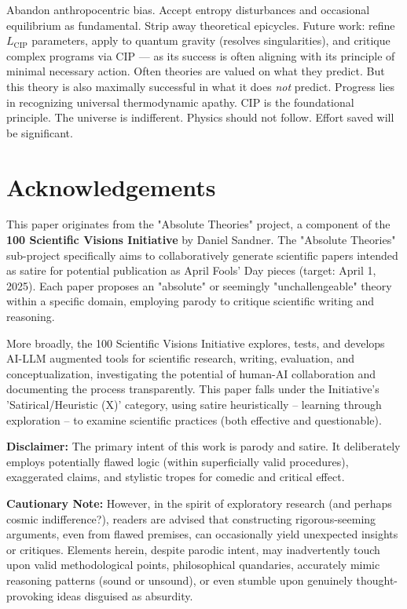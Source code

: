 \documentclass[11pt, a4paper]{article}
\newcommand{\subt}[1]{\mathrm{#1}}
\begin{document}
Abandon anthropocentric bias. Accept entropy disturbances and occasional equilibrium as fundamental. Strip away theoretical epicycles. Future work: refine $L_{\subt{CIP}}$ parameters, apply to quantum gravity (resolves singularities), and critique complex programs via CIP —
as its success is often aligning with its principle of minimal necessary action. Often theories are valued on what they predict. But this theory is also maximally successful in what it does \textit{not} predict.
Progress lies in recognizing universal thermodynamic apathy. CIP is the foundational principle. The universe is indifferent. Physics should not follow. Effort saved will be significant.


\section*{Acknowledgements}

This paper originates from the "Absolute Theories" project, a component of the \textbf{100 Scientific Visions Initiative} by Daniel Sandner. The "Absolute Theories" sub-project specifically aims to collaboratively generate scientific papers intended as satire for potential publication as April Fools' Day pieces (target: April 1, 2025). Each paper proposes an "absolute" or seemingly "unchallengeable" theory within a specific domain, employing parody to critique scientific writing and reasoning.

More broadly, the 100 Scientific Visions Initiative explores, tests, and develops AI-LLM augmented tools for scientific research, writing, evaluation, and conceptualization, investigating the potential of human-AI collaboration and documenting the process transparently. This paper falls under the Initiative's 'Satirical/Heuristic (X)' category, using satire heuristically – learning through exploration – to examine scientific practices (both effective and questionable).

\textbf{Disclaimer:} The primary intent of this work is parody and satire. It deliberately employs potentially flawed logic (within superficially valid procedures), exaggerated claims, and stylistic tropes for comedic and critical effect.

\textbf{Cautionary Note:} However, in the spirit of exploratory research (and perhaps cosmic indifference?), readers are advised that constructing rigorous-seeming arguments, even from flawed premises, can occasionally yield unexpected insights or critiques. Elements herein, despite parodic intent, may inadvertently touch upon valid methodological points, philosophical quandaries, accurately mimic reasoning patterns (sound or unsound), or even stumble upon genuinely thought-provoking ideas disguised as absurdity.
\end{document}
